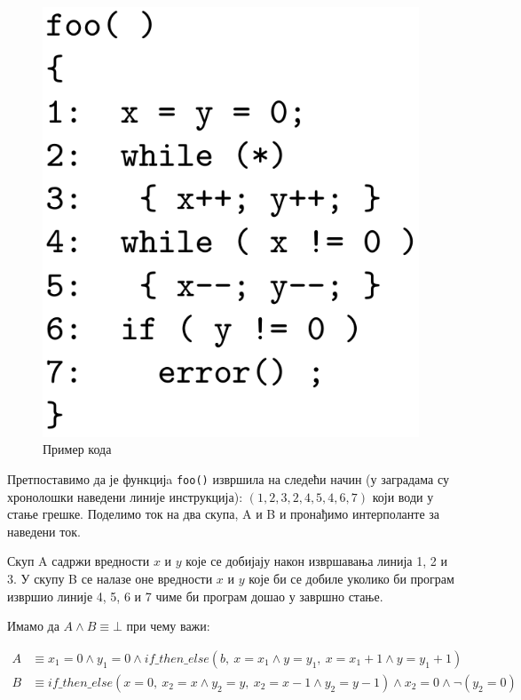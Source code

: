 \documentclass[a4paper]{article}
\begin{document}
{\begin{figure}[h!]
\begin{center}
    \includegraphics[scale=0.14]{./slike/interpolant_code.png}
\end{center}
\caption{Пример кода}
\label{fig:interpolant_example}
\end{figure}

Претпоставимо да је функцијa \texttt{foo()} извршила на следећи начин (у заградама су хронолошки наведени линије инструкција): $(1, 2, 3, 2, 4, 5, 4, 6, 7)$ који
води у стање грешке.  Поделимо ток на два скупа, A и B и пронађимо интерполанте за наведени ток.

Скуп A садржи вредности $x$ и $y$ које се добијају након извршавања линија 1, 2 и 3. У скупу B се налазе оне вредности $x$ и $y$
које би се добиле уколико би програм извршио линије 4, 5, 6 и 7 чиме би програм дошао у завршно стање.

Имамо да $A \land B \equiv \bot$ при чему важи:

\begin{equation*}
\begin{split}
    A & \equiv x_1 = 0 \land y_1 = 0 \land if\_then\_else(b,\  x = x_1 \land y = y_1,\ x = x_1 + 1 \land y = y_1 + 1)     \\
    B & \equiv if\_then\_else(x = 0,\ x_2 = x \land y_2 = y,\ x_2 = x - 1 \land y_2 = y-1) \land x_2 = 0 \land \neg (y_2 = 0)
\end{split}
\end{equation*}

}
\end{document}
